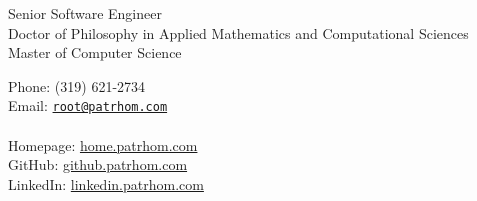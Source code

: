 \begin{minipage}[t]{0.5\textwidth}
  {\large Senior Software Engineer} \vspace{0.5em} \\
  \phantom{1} Doctor of Philosophy in Applied Mathematics and Computational Sciences  \vspace{0.5em} \\
  \phantom{1} Master of Computer Science\\
\end{minipage}
\hfill
\begin{minipage}[t]{0.4\textwidth}
  Phone: (319) 621-2734 \\
  Email: \href{mailto:root@patrhom.com}{\texttt{root@patrhom.com}} \\
  \\
  Homepage: \url{home.patrhom.com} \\
  GitHub: \url{github.patrhom.com} \\
  LinkedIn: \url{linkedin.patrhom.com} \\
\end{minipage}
